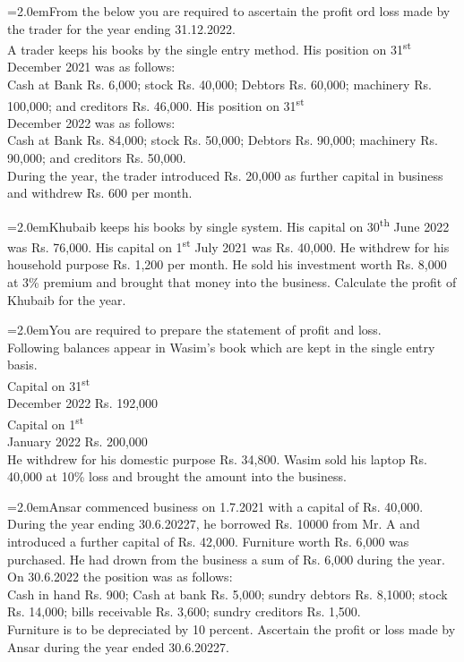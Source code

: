 \documentclass[11pt,a4paper]{article}
\newcommand{\lqn}[2]{\Needspace{6\baselineskip}\par\medskip\noindent\hangindent=2.0em\hangafter=1\makebox[2.0em][l]{\textbf{#1.}}#2\par}
\begin{document}
\lqn{1}{From the below you are required to ascertain the profit ord loss made by the trader for the year ending 31.12.2022.\\
A trader keeps his books by the single entry method. His position on 31\textsuperscript{st}\\
December 2021 was as follows:\\
Cash at Bank Rs. 6,000; stock Rs. 40,000; Debtors Rs. 60,000; machinery Rs. 100,000; and creditors Rs. 46,000. His position on 31\textsuperscript{st}\\
December 2022 was as follows:\\
Cash at Bank Rs. 84,000; stock Rs. 50,000; Debtors Rs. 90,000; machinery Rs. 90,000; and creditors Rs. 50,000.\\
During the year, the trader introduced Rs. 20,000 as further capital in business and withdrew Rs. 600 per month.\par
}
\lqn{2}{Khubaib keeps his books by single system. His capital on 30\textsuperscript{th}  June 2022 was Rs. 76,000. His capital on 1\textsuperscript{st}  July 2021 was Rs. 40,000. He withdrew for his household purpose Rs. 1,200 per month. He sold his investment worth Rs. 8,000 at 3\% premium and brought that money into the business. Calculate the profit of Khubaib for the year.\par
}
\lqn{3}{You are required to prepare the statement of profit and loss.\\
Following balances appear in Wasim’s book which are kept in the single entry basis.\\
Capital on 31\textsuperscript{st}\\
December 2022 Rs. 192,000\\
Capital on 1\textsuperscript{st}\\
January 2022 Rs. 200,000\\
He withdrew for his domestic purpose Rs. 34,800. Wasim sold his laptop Rs. 40,000 at 10\% loss and brought the amount into the business.\par
}
\lqn{4}{Ansar commenced business on 1.7.2021 with a capital of Rs. 40,000. During the year ending 30.6.20227, he borrowed Rs. 10000 from Mr. A and introduced a further capital of Rs. 42,000. Furniture worth Rs. 6,000 was purchased. He had drown from the business a sum of Rs. 6,000 during the year. On 30.6.2022 the position was as follows:\\
Cash in hand Rs. 900; Cash at bank Rs. 5,000; sundry debtors Rs. 8,1000; stock Rs. 14,000; bills receivable Rs. 3,600; sundry creditors Rs. 1,500.\\
Furniture is to be depreciated by 10 percent. Ascertain the profit or loss made by Ansar during the year ended 30.6.20227.\par
}
\end{document}
